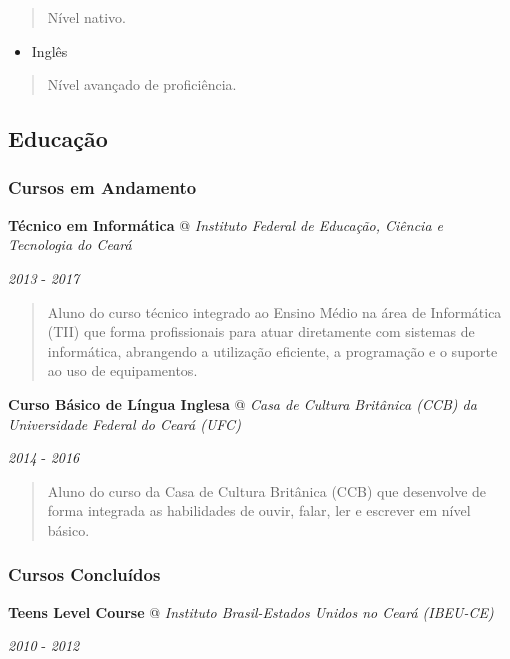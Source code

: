 \documentclass[]{article}
\providecommand{\tightlist}{%
  \setlength{\itemsep}{0pt}\setlength{\parskip}{0pt}}
\begin{document}
\begin{quote}
Nível nativo.
\end{quote}

\begin{itemize}
\tightlist
\item
  Inglês
\end{itemize}

\begin{quote}
Nível avançado de proficiência.
\end{quote}

\subsection{Educação}\label{educauxe7uxe3o}

\subsubsection{Cursos em Andamento}\label{cursos-em-andamento}

\textbf{Técnico em Informática} @ \emph{Instituto Federal de Educação,
Ciência e Tecnologia do Ceará}

\emph{2013} - \emph{2017}

\begin{quote}
Aluno do curso técnico integrado ao Ensino Médio na área de Informática
(TII) que forma profissionais para atuar diretamente com sistemas de
informática, abrangendo a utilização eficiente, a programação e o
suporte ao uso de equipamentos.
\end{quote}

\textbf{Curso Básico de Língua Inglesa} @ \emph{Casa de Cultura
Britânica (CCB) da Universidade Federal do Ceará (UFC)}

\emph{2014} - \emph{2016}

\begin{quote}
Aluno do curso da Casa de Cultura Britânica (CCB) que desenvolve de
forma integrada as habilidades de ouvir, falar, ler e escrever em nível
básico.
\end{quote}

\subsubsection{Cursos Concluídos}\label{cursos-concluuxeddos}

\textbf{Teens Level Course} @ \emph{Instituto Brasil-Estados Unidos no
Ceará (IBEU-CE)}

\emph{2010} - \emph{2012}
\end{document}
